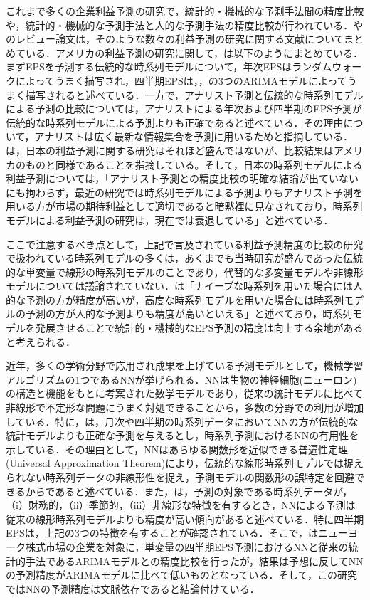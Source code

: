 \documentclass[a4paper，11pt]{jsarticle}
\begin{document}
これまで多くの企業利益予測の研究で，統計的・機械的な予測手法間の精度比較や，統計的・機械的な予測手法と人的な予測手法の精度比較が行われている．\cite{sakurai1990}や\cite{ota2006}のレビュー論文は，そのような数々の利益予測の研究に関する文献についてまとめている．アメリカの利益予測の研究に関して，\cite{sakurai1990}は以下のようにまとめている．まずEPSを予測する伝統的な時系列モデルについて，年次EPSはランダムウォークによってうまく描写され，四半期EPSは\cite*{brown1979univariate}，\cite{griffin1977time}，\cite{foster1977quarterly}の3つのARIMAモデルによってうまく描写されると述べている．一方で，アナリスト予測と伝統的な時系列モデルによる予測の比較については，アナリストによる年次および四半期のEPS予測が伝統的な時系列モデルによる予測よりも正確であると述べている．その理由について，アナリストは広く最新な情報集合を予測に用いるためと指摘している．\cite{ota2006}は，日本の利益予測に関する研究はそれほど盛んではないが、比較結果はアメリカのものと同様であることを指摘している。そして，日本の時系列モデルによる利益予測については，「アナリスト予測との精度比較の明確な結論が出ていないにも拘わらず，最近の研究では時系列モデルによる予測よりもアナリスト予測を用いる方が市場の期待利益として適切であると暗黙裡に見なされており，時系列モデルによる利益予測の研究は，現在では衰退している」と述べている．

ここで注意するべき点として，上記で言及されている利益予測精度の比較の研究で扱われている時系列モデルの多くは，あくまでも当時研究が盛んであった伝統的な単変量で線形の時系列モデルのことであり，代替的な多変量モデルや非線形モデルについては議論されていない．\cite{ota2006}は「ナイーブな時系列を用いた場合には人的な予測の方が精度が高いが，高度な時系列モデルを用いた場合には時系列モデルの予測の方が人的な予測よりも精度が高いといえる」と述べており，時系列モデルを発展させることで統計的・機械的なEPS予測の精度は向上する余地があると考えられる．

近年，多くの学術分野で応用され成果を上げている予測モデルとして，機械学習アルゴリズムの1つであるNNが挙げられる．NNは生物の神経細胞(ニューロン)の構造と機能をもとに考案された数学モデルであり，従来の統計モデルに比べて非線形で不定形な問題にうまく対処できることから，多数の分野での利用が増加している\citep*{tkavc2016artificial}．特に，\cite{hill1996neural}は，月次や四半期の時系列データにおいてNNの方が伝統的な統計モデルよりも正確な予測を与えるとし，時系列予測におけるNNの有用性を示している．その理由として，NNはあらゆる関数形を近似できる普遍性定理(Universal Approximation Theorem)\citep{hornik1989multilayer}により，伝統的な線形時系列モデルでは捉えられない時系列データの非線形性を捉え，予測モデルの関数形の誤特定を回避できるからであると述べている．また，\cite{hill1994artificial}は，予測の対象である時系列データが，（i）財務的，（ii）季節的，（iii）非線形な特徴を有するとき，NNによる予測は従来の線形時系列モデルよりも精度が高い傾向があると述べている．特に四半期EPSは，上記の3つの特徴を有することが確認されている\citep*{hopwood1986univariate}．そこで，\cite{callen1996neural}はニューヨーク株式市場の企業を対象に，単変量の四半期EPS予測におけるNNと従来の統計的手法であるARIMAモデルとの精度比較を行ったが，結果は予想に反してNNの予測精度がARIMAモデルに比べて低いものとなっている．そして，この研究ではNNの予測精度は文脈依存であると結論付けている．
\end{document}
